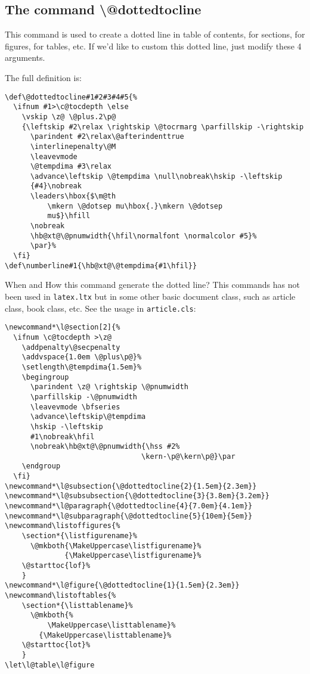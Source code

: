 \documentclass{article}
\begin{document}
\subsection{The command \textbackslash @dottedtocline}
This command is used to create a dotted line in table of contents, for sections, for figures, for tables, etc.
If we'd like to custom this dotted line, just modify these 4 arguments.


The full definition is:
\begin{lstlisting}
\def\@dottedtocline#1#2#3#4#5{%
  \ifnum #1>\c@tocdepth \else
    \vskip \z@ \@plus.2\p@
    {\leftskip #2\relax \rightskip \@tocrmarg \parfillskip -\rightskip
      \parindent #2\relax\@afterindenttrue
      \interlinepenalty\@M
      \leavevmode
      \@tempdima #3\relax
      \advance\leftskip \@tempdima \null\nobreak\hskip -\leftskip
      {#4}\nobreak
      \leaders\hbox{$\m@th
          \mkern \@dotsep mu\hbox{.}\mkern \@dotsep
          mu$}\hfill
      \nobreak
      \hb@xt@\@pnumwidth{\hfil\normalfont \normalcolor #5}%
      \par}%
  \fi}
\def\numberline#1{\hb@xt@\@tempdima{#1\hfil}}
\end{lstlisting}

When and How this command generate the dotted line? This commands has not been used in \verb|latex.ltx| but in some other basic 
document class, such as article class, book class, etc. See the usage in \verb|article.cls|:
\begin{lstlisting}
\newcommand*\l@section[2]{%
  \ifnum \c@tocdepth >\z@
    \addpenalty\@secpenalty
    \addvspace{1.0em \@plus\p@}%
    \setlength\@tempdima{1.5em}%
    \begingroup
      \parindent \z@ \rightskip \@pnumwidth
      \parfillskip -\@pnumwidth
      \leavevmode \bfseries
      \advance\leftskip\@tempdima
      \hskip -\leftskip
      #1\nobreak\hfil
      \nobreak\hb@xt@\@pnumwidth{\hss #2%
                                \kern-\p@\kern\p@}\par
    \endgroup
  \fi}
\newcommand*\l@subsection{\@dottedtocline{2}{1.5em}{2.3em}}
\newcommand*\l@subsubsection{\@dottedtocline{3}{3.8em}{3.2em}}
\newcommand*\l@paragraph{\@dottedtocline{4}{7.0em}{4.1em}}
\newcommand*\l@subparagraph{\@dottedtocline{5}{10em}{5em}}
\newcommand\listoffigures{%
    \section*{\listfigurename}%
      \@mkboth{\MakeUppercase\listfigurename}%
              {\MakeUppercase\listfigurename}%
    \@starttoc{lof}%
    }
\newcommand*\l@figure{\@dottedtocline{1}{1.5em}{2.3em}}
\newcommand\listoftables{%
    \section*{\listtablename}%
      \@mkboth{%
          \MakeUppercase\listtablename}%
        {\MakeUppercase\listtablename}%
    \@starttoc{lot}%
    }
\let\l@table\l@figure
\end{lstlisting}
\end{document}
